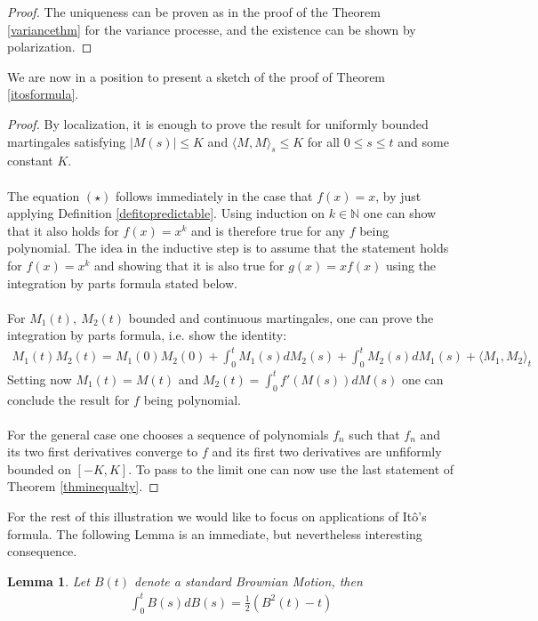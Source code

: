 \documentclass[11pt,a4paper, final]{article}
\newtheorem{lem}{Lemma}[section]
\begin{document}
\begin{proof}
The uniqueness can be proven as in the proof of the Theorem \ref{variancethm} for the variance processe, and the existence can be shown by polarization.
\end{proof}
\noindent We are now in a position to present a sketch of the proof of Theorem \ref{itosformula}.
\begin{proof}
By localization, it is enough to prove the result for uniformly bounded martingales satisfying $\lvert M(s) \rvert \leq K$ and $\langle M,M\rangle_s\leq K$ for all $0\leq s \leq t$ and some constant $K$.\\
\\
The equation $(\star)$ follows immediately in the case that $f(x)=x$, by just applying Definition \ref{defitopredictable}.
Using induction on $k \in \mathbb{N}$ one can show that it also holds for $f(x)=x^k$ and is therefore true for any $f$ being polynomial.
The idea in the inductive step is to assume that the statement holds for $f(x)=x^k$ and showing that it is also true for $g(x)=x f(x)$ using the integration by parts formula stated below.
\\\\
For $M_1(t), \ M_2(t)$ bounded and continuous martingales, one can prove the integration by parts formula, i.e. show the identity:
\begin{align*}
M_1(t) M_2(t)=M_1(0) M_2(0) + \int_0^t M_1(s) dM_2(s) + \int_0^t M_2(s) dM_1(s) + \langle M_1,M_2\rangle_t
\end{align*}
\noindent Setting now $M_1(t)=M(t)$ and $M_2(t)= \int_0^t f'(M(s)) dM(s)$ one can conclude the result for $f$ being polynomial.\\
\\
For the general case one chooses a sequence of polynomials $f_n$ such that $f_n$ and its two first derivatives converge to $f$ and its first two derivatives are unfiformly bounded on $[-K,K]$. %
To pass to the limit one can now use the last statement of Theorem \ref{thminequalty}.
\end{proof}
\noindent For the rest of this illustration we would like to focus on applications of Itô's formula. The following Lemma is an immediate, but nevertheless interesting consequence.
\begin{lem} Let $B(t)$ denote a standard Brownian Motion, then 
\begin{align*}
\int_0^t B(s) dB(s) = \frac{1}{2}( B^2(t)-t)
\end{align*}
\end{lem}
\end{document}
